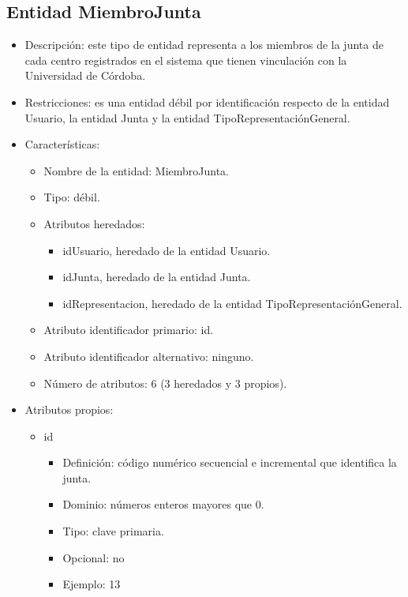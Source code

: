 \subsection{Entidad MiembroJunta}
\begin{itemize}
    \item Descripción: este tipo de entidad representa a los miembros de la junta de cada centro registrados en el sistema que tienen vinculación con la Universidad de Córdoba.
    \item Restricciones: es una entidad débil por identificación respecto de la entidad Usuario, la entidad Junta y la entidad TipoRepresentaciónGeneral.
    \item Características:
    \begin{itemize}
        \item Nombre de la entidad: MiembroJunta.
        \item Tipo: débil.
        \item Atributos heredados: 
        \begin{itemize}
            \item idUsuario, heredado de la entidad Usuario.
            \item idJunta, heredado de la entidad Junta.
            \item idRepresentacion, heredado de la entidad TipoRepresentaciónGeneral.
        \end{itemize} 
        \item Atributo identificador primario: id.
        \item Atributo identificador alternativo: ninguno.
        \item Número de atributos: 6 (3 heredados y 3 propios).
    \end{itemize}

    \item Atributos propios:
    \begin{itemize}
        \item id
        \begin{itemize}
            \item Definición: código numérico secuencial e incremental que identifica la junta.
            \item Dominio: números enteros mayores que 0.
            \item Tipo: clave primaria.
            \item Opcional: no
            \item Ejemplo: 13
        \end{itemize}


\end{itemize}
\end{itemize}
